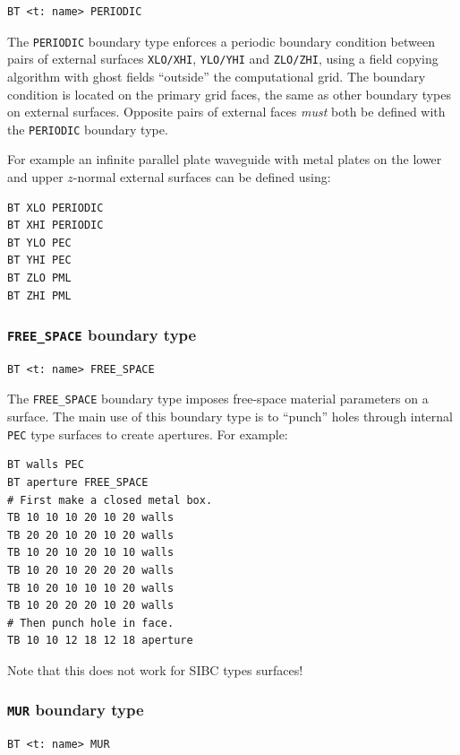 \documentclass[onecolumn,a4paper]{article}
\numberwithin{equation}{section}
\begin{document}
\begin{verbatim}
BT <t: name> PERIODIC
\end{verbatim}

The \texttt{PERIODIC} boundary type enforces a periodic boundary condition between pairs of external
surfaces \texttt{XLO/XHI}, \texttt{YLO/YHI} and \texttt{ZLO/ZHI}, using a field copying 
algorithm with ghost fields ``outside'' the computational grid. The boundary condition is located on 
the primary grid faces, the same as other boundary types on external surfaces. Opposite pairs of
external faces {\em must} both be defined with the \texttt{PERIODIC} boundary type.

For example an infinite parallel plate waveguide with metal plates on the lower and upper
$z$-normal external surfaces can be defined using:
\begin{verbatim}
BT XLO PERIODIC
BT XHI PERIODIC
BT YLO PEC
BT YHI PEC
BT ZLO PML
BT ZHI PML
\end{verbatim}

\subsubsection{\texttt{FREE\_SPACE} boundary type}

\begin{verbatim}
BT <t: name> FREE_SPACE
\end{verbatim}

The \texttt{FREE\_SPACE} boundary type imposes free-space material parameters on a
surface. The main use of this boundary type is to ``punch'' holes through
internal \texttt{PEC} type surfaces to create apertures. For example:
\begin{verbatim}
BT walls PEC 
BT aperture FREE_SPACE
# First make a closed metal box.
TB 10 10 10 20 10 20 walls
TB 20 20 10 20 10 20 walls
TB 10 20 10 20 10 10 walls
TB 10 20 10 20 20 20 walls
TB 10 20 10 10 10 20 walls
TB 10 20 20 20 10 20 walls
# Then punch hole in face.
TB 10 10 12 18 12 18 aperture
\end{verbatim}

Note that this does not work for SIBC types surfaces!

\subsubsection{\texttt{MUR} boundary type}

\begin{verbatim}
BT <t: name> MUR
\end{verbatim}
\end{document}
